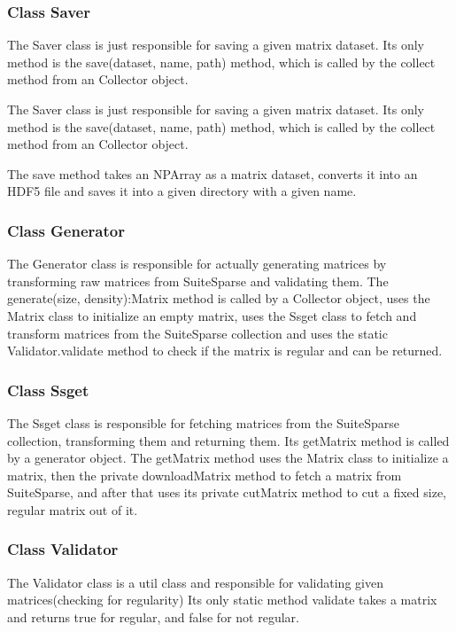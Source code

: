 \documentclass[parskip=full]{scrartcl}
\begin{document}
\subsubsection{Class Saver}

The Saver class is just responsible for saving a given matrix dataset.
Its only method is the save(dataset, name, path) method, which
is called by the collect method from an Collector object.

The Saver class is just responsible for saving a given matrix dataset. Its only method is the save(dataset, name, path) method, which
is called by the collect method from an Collector object. 

The save method takes an NPArray as a matrix dataset, converts it into an HDF5 file and saves it into a given directory with a given name.

\subsubsection{Class Generator}
The Generator class is responsible for actually generating matrices by transforming raw matrices from SuiteSparse and validating them.
The generate(size, density):Matrix method is called by a Collector object, uses the Matrix class to initialize an empty matrix, uses the Ssget class to fetch and transform matrices from the SuiteSparse collection and uses the static Validator.validate method to check if the matrix is regular and can be returned.

\subsubsection{Class Ssget}
The Ssget class is responsible for fetching matrices from the SuiteSparse collection, transforming them and returning them.
Its getMatrix method is called by a generator object.
The getMatrix method uses the Matrix class to initialize a matrix, then the private downloadMatrix method to fetch a matrix from SuiteSparse, and after that uses its private cutMatrix method to cut a fixed size, regular matrix out of it.

\subsubsection{Class Validator}

The Validator class is a util class and responsible for validating given matrices(checking for regularity)
 Its only static method validate takes a matrix and returns true for regular, and false for not regular.
\end{document}
